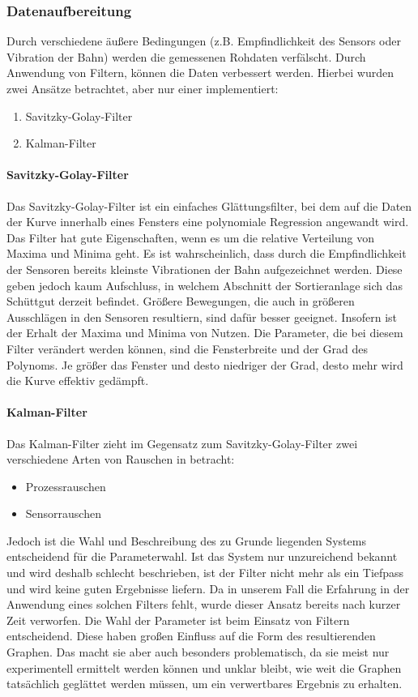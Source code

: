\subsubsection{Datenaufbereitung}
Durch verschiedene äußere Bedingungen (z.B. Empfindlichkeit des Sensors oder Vibration der Bahn) werden die gemessenen Rohdaten verfälscht. Durch Anwendung von Filtern, können die Daten verbessert werden.
Hierbei wurden zwei Ansätze betrachtet, aber nur einer implementiert:
\begin{enumerate}
\item Savitzky-Golay-Filter
\item Kalman-Filter
\end{enumerate}
\paragraph{Savitzky-Golay-Filter}
Das Savitzky-Golay-Filter ist ein einfaches Glättungsfilter, bei dem auf die Daten der Kurve innerhalb eines Fensters eine polynomiale Regression angewandt wird. Das Filter hat gute Eigenschaften, wenn es um die relative Verteilung von Maxima und Minima geht. Es ist wahrscheinlich, dass durch die Empfindlichkeit der Sensoren bereits kleinste Vibrationen der Bahn aufgezeichnet werden. Diese geben jedoch kaum Aufschluss, in welchem Abschnitt der Sortieranlage sich das Schüttgut derzeit befindet. Größere Bewegungen, die auch in größeren Ausschlägen in den Sensoren resultiern, sind dafür besser geeignet. Insofern ist der Erhalt der Maxima und Minima von Nutzen.
Die Parameter, die bei diesem Filter verändert werden können, sind die Fensterbreite und der Grad des Polynoms. Je größer das Fenster und desto niedriger der Grad, desto mehr wird die Kurve effektiv gedämpft.
\paragraph{Kalman-Filter}
Das Kalman-Filter zieht im Gegensatz zum Savitzky-Golay-Filter zwei verschiedene Arten von Rauschen in betracht:
\begin{itemize}
\item Prozessrauschen 
\item Sensorrauschen
\end{itemize}
Jedoch ist die Wahl und Beschreibung des zu Grunde liegenden Systems entscheidend für die Parameterwahl. Ist das System nur unzureichend bekannt und wird deshalb schlecht beschrieben, ist der Filter nicht mehr als ein Tiefpass und wird keine guten Ergebnisse liefern. Da in unserem Fall die Erfahrung in der Anwendung eines solchen Filters fehlt, wurde dieser Ansatz bereits nach kurzer Zeit verworfen.
Die Wahl der Parameter ist beim Einsatz von Filtern entscheidend. Diese haben großen Einfluss auf die Form des resultierenden Graphen. Das macht sie aber auch besonders problematisch, da sie meist nur experimentell ermittelt werden können und unklar bleibt, wie weit die Graphen tatsächlich geglättet werden müssen, um ein verwertbares Ergebnis zu erhalten. 
